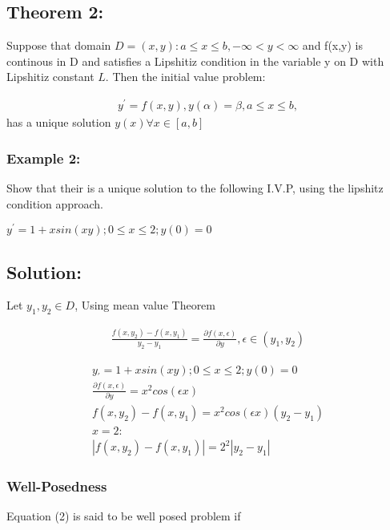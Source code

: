 \documentclass{article}
\begin{document}
\subsection*{Theorem 2:} Suppose that domain $D = {(x,y): a \leq x \leq b, - \infty < y < \infty }$ and f(x,y) is continous in D and satisfies a Lipshitiz condition in the variable y on D with Lipshitiz constant $L$. Then the initial value problem:

\begin{equation} \label{eq2}
    \begin{split}
        y^{'} = f(x,y), 
        y(\alpha) = \beta,
        a \leq x \leq b,
    \end{split}
\end{equation}
has a unique solution $y(x) \forall x \in [a,b]$

\subsubsection*{Example 2:} Show that their is a unique solution to the following I.V.P, using the lipshitz condition approach.

$y^{'} = 1 + xsin(xy); 0\leq x \leq 2; y(0) = 0$
\subsection*{Solution:}
Let $y_{1}, y_{2} \in D$, Using mean value Theorem

\begin{eqnarray}
    \frac{f(x,y_{2})-f(x,y_{1})}{y_{2}-y_{1}} = \frac{\partial f(x,\epsilon)}{\partial y},
    \epsilon \in (y_{1},y_{2})
\end{eqnarray}


\begin{equation*}
    \begin{split}
        y_{'} = 1 + xsin(xy); 0\leq x \leq 2; y(0) = 0 \\
        \frac{\partial f(x,\epsilon)}{\partial y} = x^{2}cos(\epsilon x) \\
        f(x,y_{2}) - f(x,y_{1}) = x^{2}cos(\epsilon x)(y_{2}-y_{1})\\ 
        x = 2: \\
        |f(x,y_{2}) - f(x,y_{1})| = 2^{2}|y_{2}-y_{1}|
    \end{split}
\end{equation*}

\subsubsection*{Well-Posedness}
Equation (2) is said to be well posed problem if
\end{document}
